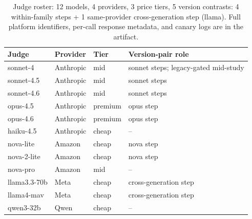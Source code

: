 \begin{table}[t]\centering\caption{Judge roster: 12 models, 4 providers, 3 price tiers, 5 version contrasts: 4 within-family steps + 1 same-provider cross-generation step (llama). Full platform identifiers, per-call response metadata, and canary logs are in the artifact.}
\label{tab:roster}\small\begin{tabular}{llll}\toprule
Judge & Provider & Tier & Version-pair role \\ \midrule
sonnet-4 & Anthropic & mid & sonnet steps; legacy-gated mid-study \\
sonnet-4.5 & Anthropic & mid & sonnet steps \\
sonnet-4.6 & Anthropic & mid & sonnet steps \\
opus-4.5 & Anthropic & premium & opus step \\
opus-4.6 & Anthropic & premium & opus step \\
haiku-4.5 & Anthropic & cheap & -- \\
nova-lite & Amazon & cheap & nova step \\
nova-2-lite & Amazon & cheap & nova step \\
nova-pro & Amazon & mid & -- \\
llama3.3-70b & Meta & cheap & cross-generation step \\
llama4-mav & Meta & cheap & cross-generation step \\
qwen3-32b & Qwen & cheap & -- \\
\bottomrule\end{tabular}\end{table}
